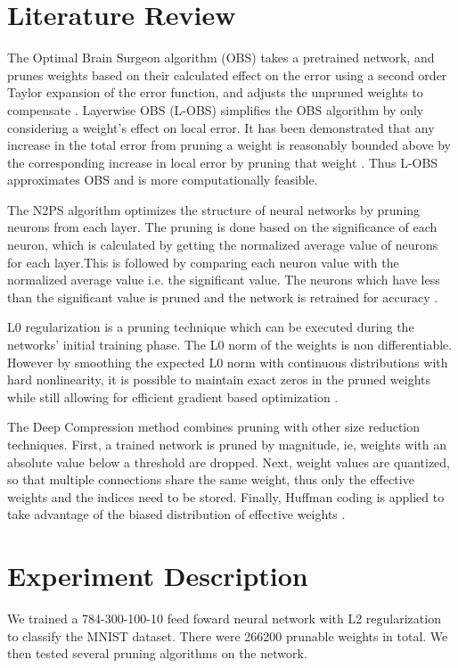 \documentclass{article}
\begin{document}
\section{Literature Review}
\label{Literature Review}
The Optimal Brain Surgeon algorithm (OBS) takes a pretrained network, and prunes weights based on their calculated effect on the error using a second order Taylor expansion of the error function, and adjusts the unpruned weights to compensate \cite{Hassibi93}. Layerwise OBS (L-OBS) simplifies the OBS algorithm by only considering a weight's effect on local error. It has been demonstrated that any increase in the total error from pruning a weight is reasonably bounded above by the corresponding increase in local error by pruning that weight \cite{Dong17}. Thus L-OBS approximates OBS and is more computationally feasible.

The N2PS algorithm optimizes the structure of neural networks by pruning neurons from each layer. The pruning is done based on the significance of each neuron, which is calculated by getting the normalized average value of neurons for each layer.This is followed by comparing each neuron value with the normalized average value i.e. the significant value. The neurons which have less than the significant value is pruned and the network is retrained for accuracy \cite{Augasta11}.

L0 regularization is a pruning technique which can be executed during the networks' initial training phase. The L0 norm of the weights is non differentiable. However by smoothing the expected L0 norm with continuous distributions with hard nonlinearity, it is possible to maintain exact zeros in the pruned weights while still allowing for efficient gradient based optimization \cite{Louizos17}. 

The Deep Compression method combines pruning with other size reduction techniques. First, a trained network is pruned by magnitude, ie, weights with an absolute value below a threshold are dropped. Next, weight values are quantized, so that multiple connections share the same weight, thus only the effective weights and the indices need to be stored. Finally, Huffman coding is applied to take advantage of the biased distribution of effective weights \cite{Han15}.

\section{Experiment Description}
\label{Experiment Description} We trained a 784-300-100-10 feed foward neural network with L2 regularization to classify the MNIST dataset. There were 266200 prunable weights in total. We then tested several pruning algorithms on the network. 
\end{document}

